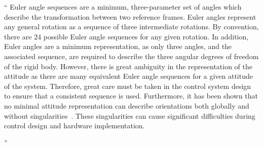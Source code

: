 \documentclass[11pt]{article}
\newenvironment{correction}{\begin{list}{}{\setlength{\leftmargin}{1cm}\setlength{\rightmargin}{1cm}}\vspace{\parsep}\item[]``}{''\end{list}}
\begin{document}
\begin{enumerate}
\begin{correction}
Euler angle sequences are a minimum, three-parameter set of angles which describe the transformation between two reference frames.
Euler angles represent any general rotation as a sequence of three intermediate rotations.
By convention, there are \( 24 \) possible Euler angle sequences for any given rotation.
In addition, Euler angles are a minimum representation, as only three angles, and the associated sequence, are required to describe the three angular degrees of freedom of the rigid body.
However, there is great ambiguity in the representation of the attitude as there are many equivalent Euler angle sequences for a given attitude of the system.
Therefore, great care must be taken in the control system design to ensure that a consistent sequence is used. 
Furthermore, it has been shown that no minimal attitude representation can describe orientations both globally and without singularities~\cite{hughes2004,bhat2000}.
These singularities can cause significant difficulties during control design and hardware implementation.


\end{correction}
\end{enumerate}
\end{document}
